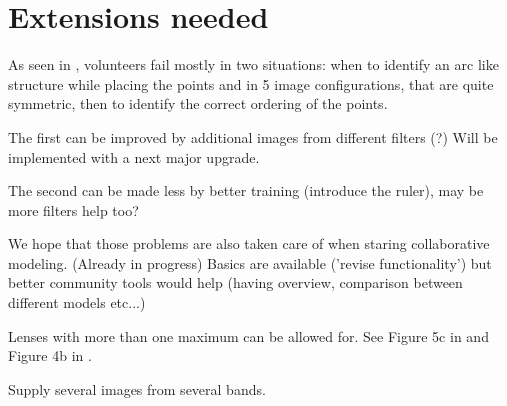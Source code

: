 \section{Extensions needed} \label{sec:todo}

As seen in , volunteers fail mostly in two situations:
when to identify an arc like structure while placing the points
and in 5 image configurations, that are quite symmetric, then to identify the correct ordering of the points.

The first can be improved by additional images from different filters (?)
Will be implemented with a next major \spl upgrade.

The second can be made less by better training (introduce the ruler), may be more filters help too?

We hope that those problems are also taken care of when staring collaborative modeling. (Already in progress)
Basics are available ('revise functionality') but better community tools would help (having overview, comparison between different models etc...)

Lenses with more than one maximum can be allowed for.  See Figure 5c
in \citep{2001ApJ...557..594R} and Figure 4b in
\cite{2003ApJ...590...39K}.

Supply several images from several bands.


